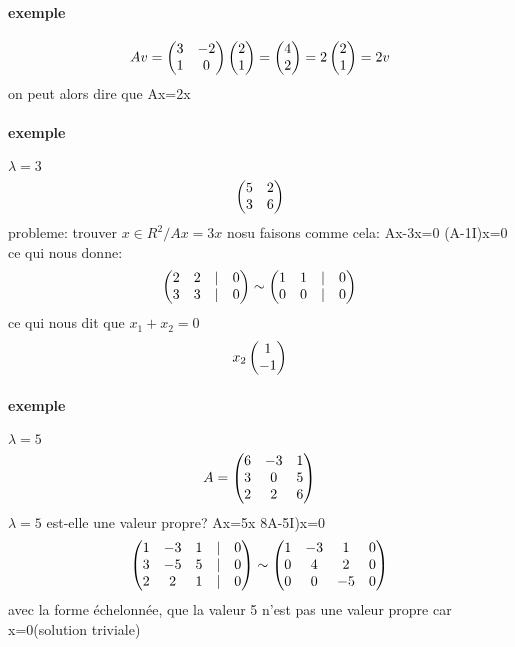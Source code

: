 \documentclass[a4paper,10pt]{article}
\begin{document}
\paragraph{exemple}
\[
Av=
\begin{pmatrix}
3&-2\cr
1&0\cr
\end{pmatrix}
\begin{pmatrix}
2\cr
1\cr
\end{pmatrix}
=
\begin{pmatrix}
4\cr
2\cr
\end{pmatrix}
=2
\begin{pmatrix}
2\cr
1\cr
\end{pmatrix}
=2v
\]
on peut alors dire que Ax=2x
\paragraph{exemple}
$\lambda=3$
\newline
\[
\begin{pmatrix}
5&2\cr
3&6\cr
\end{pmatrix}
\]
\newline
probleme: trouver $x\in R^2/Ax=3x$
\newline
nosu faisons comme cela: Ax-3x=0
\newline
(A-1I)x=0
\newline
ce qui nous donne:
\[
\begin{pmatrix}
2&2&|&0\cr
3&3&|&0\cr
\end{pmatrix}
\sim
\begin{pmatrix}
 1&1&|&0\cr
 0&0&|&0\cr
\end{pmatrix}
\]
\newline
ce qui nous dit que $x_1+x_2=0$ 
\newline
\[
x_2
\begin{pmatrix}
 1\cr
 -1\cr
\end{pmatrix}
\]
\paragraph{exemple}
$\lambda = 5$
\newline
\[
A=
\begin{pmatrix}
6&-3&1\cr
3&0&5\cr
2&2&6\cr
\end{pmatrix}
\]
\newline
$\lambda=5$ est-elle une valeur propre?
\newline
Ax=5x
\newline
8A-5I)x=0
\newline
\[
\begin{pmatrix}
1&-3&1&|&0\cr
3&-5&5&|&0\cr
2&2&1&|&0\cr
\end{pmatrix}
\sim
\begin{pmatrix}
1&-3&1&0\cr
0&4&2&0\cr
0&0&-5&0\cr
\end{pmatrix}
\]
\newline
avec la forme échelonnée, que la valeur 5 n'est pas une valeur propre car x=0(solution triviale)
\end{document}
